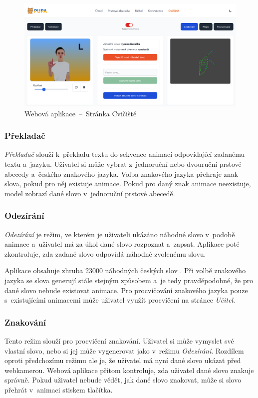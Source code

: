 \documentclass[
  master,
  program=ainfvs,
  biblatex,
  figures=true,
  tables=false,
  sourcecodes=true,
  glossaries,
  index
]{kidiplom}
\begin{document}
        \begin{figure}[htbp]
            \centering
            \includegraphics[width=1\columnwidth]{graphics/playground.png}
            \caption{Webová aplikace~--~Stránka Cvičiště}
            \label{playground}
        \end{figure}

        
        \subsubsection{Překladač}
            \emph{Překladač} slouží k~překladu textu do sekvence animací odpovídající zadanému textu a~jazyku. Uživatel si může vybrat z~jednoruční nebo dvouruční prstové abecedy a~českého znakového jazyka. Volba znakového jazyka přehraje znak slova, pokud pro něj existuje animace. Pokud pro daný znak animace neexistuje, model zobrazí dané slovo v~jednoruční prstové abecedě.

        \subsubsection{Odezírání}
            \emph{Odezírání} je režim, ve kterém je uživateli ukázáno náhodné slovo v~podobě animace a~uživatel má za úkol dané slovo rozpoznat a~zapsat. Aplikace poté zkontroluje, zda zadané slovo odpovídá náhodně zvolenému slovu. 
            
            Aplikace obsahuje zhruba 23000 náhodných českých slov \cite{ceska-slova}. Při volbě znakového jazyka se slova generují stále stejným způsobem a~je tedy pravděpodobné, že pro dané slovo nebude existovat animace. Pro procvičování znakového jazyka pouze s~existujícími animacemi může uživatel využít procvičení na stránce \emph{Učitel}.
        
        \subsubsection{Znakování}
            Tento režim slouží pro procvičení znakování. Uživatel si může vymyslet své vlastní slovo, nebo si jej může vygenerovat jako v~režimu \emph{Odezírání}. Rozdílem oproti předchozímu režimu ale je, že uživatel má nyní dané slovo ukázat před webkamerou. Webová aplikace přitom kontroluje, zda uživatel dané slovo znakuje správně. Pokud uživatel nebude vědět, jak dané slovo znakovat, může si slovo přehrát v~animaci stiskem tlačítka.
        
\end{document}
